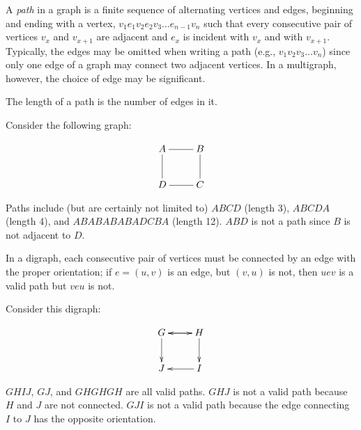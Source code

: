 \documentclass{article}
\begin{document}
A \emph{path} in a graph is a finite sequence of alternating vertices and edges, beginning and ending with a vertex, $v_1e_1v_2e_2v_3\dots e_{n-1}v_n$ such that every consecutive pair of vertices $v_x$ and $v_{x+1}$ are adjacent and $e_x$ is incident with $v_x$ and with $v_{x+1}$.  Typically, the edges may be omitted when writing a path (e.g., $v_1v_2v_3\dots v_n$) since only one edge of a graph may connect two adjacent vertices.  In a multigraph, however, the choice of edge may be significant.  

The length of a path is the number of edges in it.

Consider the following graph:

$$\xymatrix{
A \ar@{-}[r] & B \ar@{-}[d] \\
D \ar@{-}[u] & C \ar@{-}[l] }$$

Paths include (but are certainly not limited to) $ABCD$ (length 3), $ABCDA$ (length 4), and $ABABABABADCBA$ (length 12).  $ABD$ is not a path since $B$ is not adjacent to $D$.

In a digraph, each consecutive pair of vertices must be connected by an edge with the proper orientation; if $e=(u,v)$ is an edge, but $(v,u)$ is not, then $uev$ is a valid path but $veu$ is not.

Consider this digraph:

$$\xymatrix{
G \ar[r] \ar[d] & H \ar[d] \ar[l] \\
J & I \ar[l] }$$

$GHIJ$, $GJ$, and $GHGHGH$ are all valid paths.  $GHJ$ is not a valid path because $H$ and $J$ are not connected.  $GJI$ is not a valid path because the edge connecting $I$ to $J$ has the opposite orientation.
\end{document}
